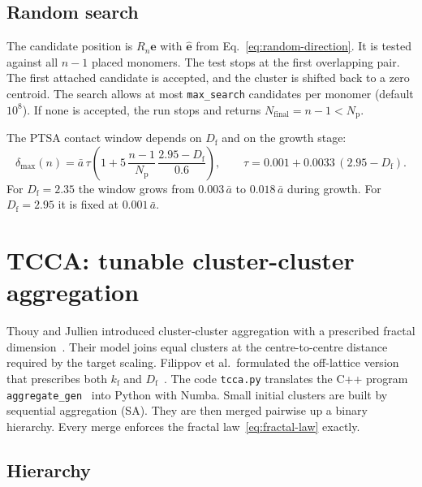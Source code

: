 \documentclass[11pt,a4paper]{article}
\newcommand{\abar}{\bar{a}}
\newcommand{\Df}{D_\text{f}}
\newcommand{\kf}{k_\text{f}}
\newcommand{\dmax}{\delta_\text{max}}
\begin{document}
\subsection{Random search}
\label{sec:ptsa-search}

The candidate position is $R_n \hat{\bm{e}}$ with $\hat{\bm{e}}$ from Eq.~\eqref{eq:random-direction}.
It is tested against all $n-1$ placed monomers.
The test stops at the first overlapping pair.
The first attached candidate is accepted, and the cluster is shifted back to a zero centroid.
The search allows at most \texttt{max\_search} candidates per monomer (default $10^8$).
If none is accepted, the run stops and returns $N_\text{final} = n - 1 < N_\text{p}$.

The PTSA contact window depends on $\Df$ and on the growth stage:
\begin{equation}
  \dmax(n) = \abar\,\tau \left( 1 + 5\,\frac{n-1}{N_\text{p}}\,\frac{2.95 - \Df}{0.6} \right), \qquad
  \tau = 0.001 + 0.0033\,(2.95 - \Df) .
  \label{eq:ptsa-window}
\end{equation}
For $\Df = 2.35$ the window grows from $0.003\,\abar$ to $0.018\,\abar$ during growth.
For $\Df = 2.95$ it is fixed at $0.001\,\abar$.

\section{TCCA: tunable cluster-cluster aggregation}
\label{sec:tcca}

Thouy and Jullien introduced cluster-cluster aggregation with a prescribed fractal dimension~\cite{thouy1994}.
Their model joins equal clusters at the centre-to-centre distance required by the target scaling.
Filippov et al.\ formulated the off-lattice version that prescribes both $\kf$ and $\Df$~\cite{filippov2000}.
The code \texttt{tcca.py} translates the C++ program \texttt{aggregate\_gen}~\cite{moteki2019} into Python with Numba.
Small initial clusters are built by sequential aggregation (SA).
They are then merged pairwise up a binary hierarchy.
Every merge enforces the fractal law~\eqref{eq:fractal-law} exactly.

\subsection{Hierarchy}
\label{sec:tcca-hierarchy}
\end{document}
